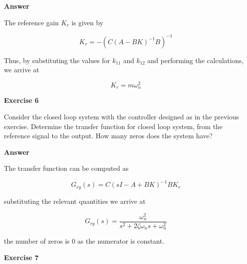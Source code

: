 \textbf{Answer}

The reference gain $K_r$ is given by 

\begin{equation}
K_r = - ( C(A-BK)^{-1}B)^{-1} 
\end{equation}

Thus, by substituting the values for $k_{11}$ and $k_{12}$ and performing the calculations, we arrive at 

\begin{equation}
K_r = m\omega_{n}^{2}
\end{equation}


\textbf{Exercise 6}

Consider the closed loop system with the controller designed as in the previous exercise. Determine the transfer function for closed loop system, from the reference signal to the output.  How many zeros does the system have?

\textbf{Answer}

The transfer function can be computed as

\begin{equation}
G_{ry}(s) = C(sI - A + BK)^{-1}BK_r \nonumber
\end{equation}

substituting the relevant quantities we arrive at

\begin{equation}
G_{ry}(s) = \frac{\omega_{n}^{2}}{s^2 + 2\zeta\omega_n s + \omega_{n}^{2}}  \nonumber
\end{equation}

the number of zeros is 0 as the numerator is constant.

\textbf{Exercise 7}

